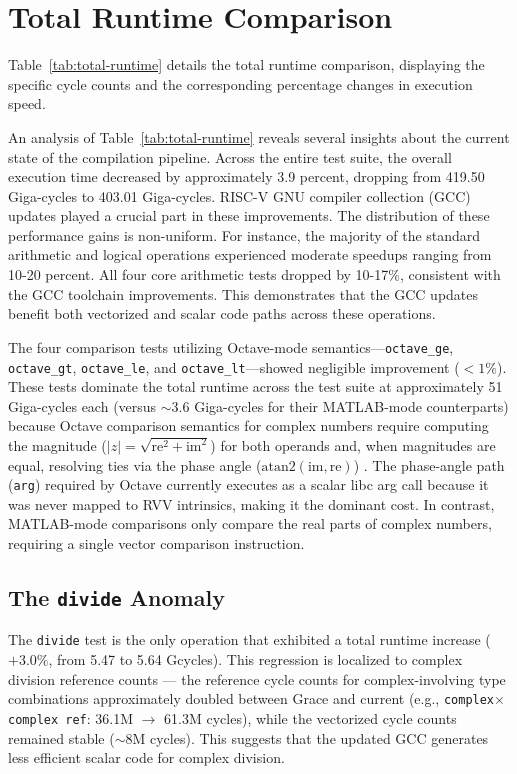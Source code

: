 \section{Total Runtime Comparison}

Table~\ref{tab:total-runtime} details the total runtime comparison, displaying the specific cycle counts and the corresponding percentage changes in execution speed.



An analysis of Table~\ref{tab:total-runtime} reveals several insights about the current state of the compilation pipeline. Across the entire test suite, the overall execution time decreased by approximately 3.9 percent, dropping from 419.50 Giga-cycles to 403.01 Giga-cycles. RISC-V GNU compiler collection (GCC) updates played a crucial part in these improvements. The distribution of these performance gains is non-uniform. For instance, the majority of the standard arithmetic and logical operations experienced moderate speedups ranging from 10-20 percent. All four core arithmetic tests dropped by 10-17\%, consistent with the GCC toolchain improvements. This demonstrates that the GCC updates benefit both vectorized and scalar code paths across these operations.

The four comparison tests utilizing Octave-mode semantics---\texttt{octave\_ge}, \texttt{octave\_gt}, \texttt{octave\_le}, and \texttt{octave\_lt}---showed negligible improvement ($< 1\%$). These tests dominate the total runtime across the test suite at approximately 51 Giga-cycles each (versus $\sim$3.6 Giga-cycles for their MATLAB-mode counterparts) because Octave comparison semantics for complex numbers require computing the magnitude ($|z| = \sqrt{\text{re}^2 + \text{im}^2}$) for both operands and, when magnitudes are equal, resolving ties via the phase angle ($\text{atan2}(\text{im}, \text{re})$) \cite{octave_comparison_ops}. The phase-angle path (\texttt{arg}) required by Octave currently executes as a scalar libc arg call because it was never mapped to RVV intrinsics, making it the dominant cost. In contrast, MATLAB-mode comparisons only compare the real parts of complex numbers, requiring a single vector comparison instruction.

\subsection{The \texttt{divide} Anomaly}

The \texttt{divide} test is the only operation that exhibited a total runtime increase ($+3.0\%$, from 5.47 to 5.64 Gcycles). This regression is localized to complex division reference counts --- the reference cycle counts for complex-involving type combinations approximately doubled between Grace and current (e.g., \texttt{complex$\times$complex ref}: 36.1M $\rightarrow$ 61.3M cycles), while the vectorized cycle counts remained stable ($\sim$8M cycles). This suggests that the updated GCC generates less efficient scalar code for complex division.

